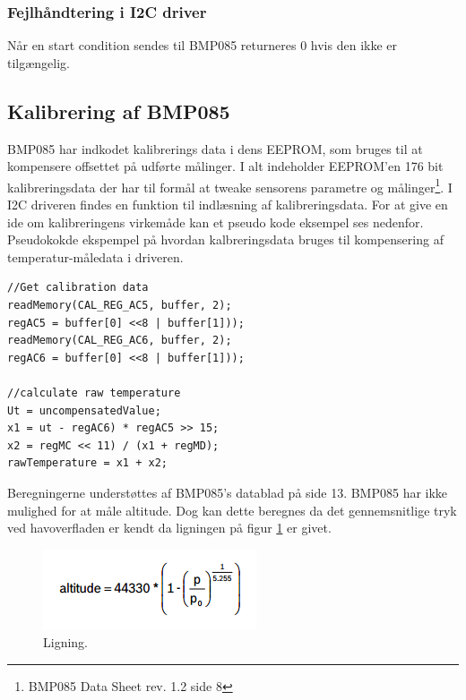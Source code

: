 \subsubsection{Fejlhåndtering i I2C driver}
Når en start condition sendes til BMP085 returneres 0 hvis den ikke er tilgængelig.

\subsection{Kalibrering af BMP085}
BMP085 har indkodet kalibrerings data i dens EEPROM, som bruges til at kompensere offsettet på udførte målinger. I alt indeholder EEPROM’en 176 bit kalibreringsdata der har til formål at tweake sensorens parametre og målinger\footnote{BMP085 Data Sheet rev. 1.2 side 8}. I I2C driveren findes en funktion til indlæsning af kalibreringsdata.
For at give en ide om kalibreringens virkemåde kan et pseudo kode eksempel ses nedenfor. 
Pseudokokde ekspempel på hvordan kalbreringsdata bruges til kompensering af temperatur-måledata i driveren.

\begin{lstlisting}
//Get calibration data
readMemory(CAL_REG_AC5, buffer, 2);
regAC5 = buffer[0] <<8 | buffer[1]));
readMemory(CAL_REG_AC6, buffer, 2);
regAC6 = buffer[0] <<8 | buffer[1]));

//calculate raw temperature
Ut = uncompensatedValue;
x1 = ut - regAC6) * regAC5 >> 15;
x2 = regMC << 11) / (x1 + regMD);
rawTemperature = x1 + x2;
\end{lstlisting}

Beregningerne understøttes af BMP085’s datablad på side 13.
BMP085 har ikke mulighed for at måle altitude. Dog kan dette beregnes da det gennemsnitlige tryk ved havoverfladen er kendt da ligningen på figur \ref{fig:equation} er givet.

\begin{figure}[h]
	\centering
	\includegraphics[width=0.4\linewidth]{figs/equation}
	\caption{Ligning.}
	\label{fig:equation}
\end{figure}




